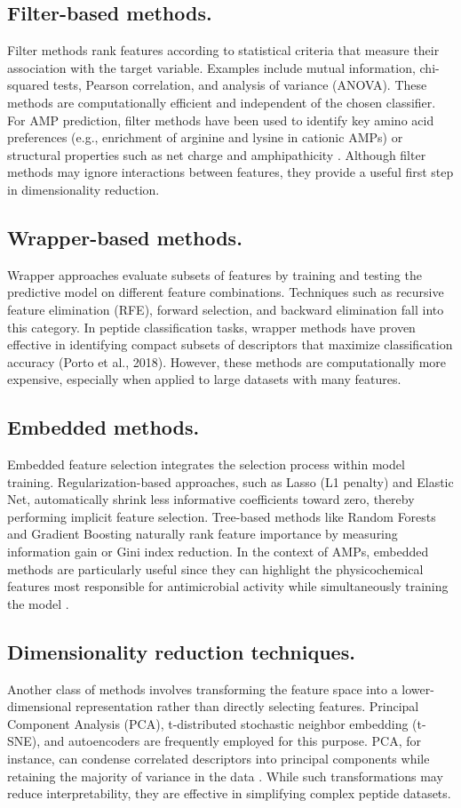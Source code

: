 \documentclass[a4paper,twoside,12pt]{book}
\begin{document}
\subsection{Filter-based methods.}
Filter methods rank features according to statistical criteria that measure their association with the target variable. Examples include mutual information, chi-squared tests, Pearson correlation, and analysis of variance (ANOVA). These methods are computationally efficient and independent of the chosen classifier. For AMP prediction, filter methods have been used to identify key amino acid preferences (e.g., enrichment of arginine and lysine in cationic AMPs) or structural properties such as net charge and amphipathicity \cite{bib:meher2017}. Although filter methods may ignore interactions between features, they provide a useful first step in dimensionality reduction.

\subsection{Wrapper-based methods.}
Wrapper approaches evaluate subsets of features by training and testing the predictive model on different feature combinations. Techniques such as recursive feature elimination (RFE), forward selection, and backward elimination fall into this category. In peptide classification tasks, wrapper methods have proven effective in identifying compact subsets of descriptors that maximize classification accuracy (Porto et al., 2018). However, these methods are computationally more expensive, especially when applied to large datasets with many features.

\subsection{Embedded methods.}
Embedded feature selection integrates the selection process within model training. Regularization-based approaches, such as Lasso (L1 penalty) and Elastic Net, automatically shrink less informative coefficients toward zero, thereby performing implicit feature selection. Tree-based methods like Random Forests and Gradient Boosting naturally rank feature importance by measuring information gain or Gini index reduction. In the context of AMPs, embedded methods are particularly useful since they can highlight the physicochemical features most responsible for antimicrobial activity while simultaneously training the model \cite{bib:mishra2022}.

\subsection{Dimensionality reduction techniques.}
Another class of methods involves transforming the feature space into a lower-dimensional representation rather than directly selecting features. Principal Component Analysis (PCA), t-distributed stochastic neighbor embedding (t-SNE), and autoencoders are frequently employed for this purpose. PCA, for instance, can condense correlated descriptors into principal components while retaining the majority of variance in the data \cite{bib:zhang2021}. While such transformations may reduce interpretability, they are effective in simplifying complex peptide datasets.
\end{document}

